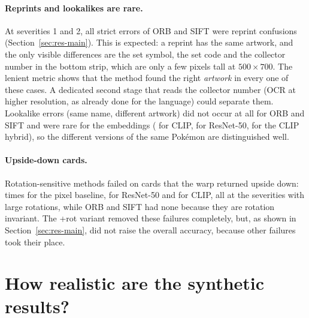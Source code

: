 \paragraph{Reprints and lookalikes are rare.} At severities 1 and 2, all strict errors of ORB and SIFT were reprint confusions (Section~\ref{sec:res-main}). This is expected: a reprint has the same artwork, and the only visible differences are the set symbol, the set code and the collector number in the bottom strip, which are only a few pixels tall at $500\times700$. The lenient metric shows that the method found the right \emph{artwork} in every one of these cases. A dedicated second stage that reads the collector number (OCR at higher resolution, as already done for the language) could separate them. Lookalike errors (same name, different artwork) did not occur at all for ORB and SIFT and were rare for the embeddings ( for CLIP,  for ResNet-50,  for the CLIP hybrid), so the different versions of the same Pok\'emon are distinguished well.

\paragraph{Upside-down cards.} Rotation-sensitive methods failed on cards that the warp returned upside down:  times for the pixel baseline,  for ResNet-50 and  for CLIP, all at the severities with large rotations, while ORB and SIFT had none because they are rotation invariant. The +rot variant removed these failures completely, but, as shown in Section~\ref{sec:res-main}, did not raise the overall accuracy, because other failures took their place.

\section{How realistic are the synthetic results?}
\label{sec:disc-synthetic}

